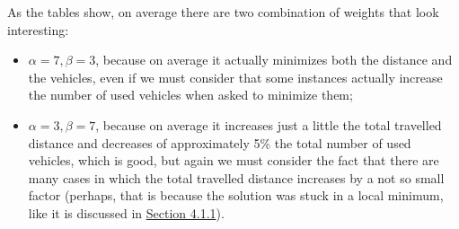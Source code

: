 As the tables show, on average there are two combination of weights that look interesting:
\begin{itemize}
    \item $\alpha=7,\beta=3$, because on average it actually minimizes both the distance and the vehicles, even if we must consider that some instances actually increase the number of used vehicles when asked to minimize them;
    \item $\alpha=3,\beta=7$, because on average it increases just a little the total travelled distance and decreases of approximately 5\% the total number of used vehicles, which is good, but again we must consider the fact that there are many cases in which the total travelled distance increases by a not so small factor (perhaps, that is because the solution was stuck in a local minimum, like it is discussed in \hyperref[subsubsec:failures-unweighted-obj-fun]{Section 4.1.1}).
\end{itemize}
